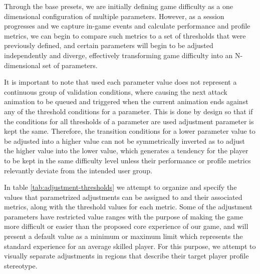 Through the base presets, we are initially defining game difficulty as a one dimensional configuration of multiple parameters. However, as a session progresses and we capture in-game events and calculate performance and profile metrics, we can begin to compare such metrics to a set of thresholds that were previously defined, and certain parameters will begin to be adjusted independently and diverge, effectively transforming game difficulty into an N-dimensional set of parameters.

It is important to note that used each parameter value does not represent a continuous group of validation conditions, where causing the next attack animation to be queued and triggered when the current animation ends against any of the threshold conditions for a parameter. This is done by design so that if the conditions for all thresholds of a parameter are used adjustment parameter is kept the same. Therefore, the transition conditions for a lower parameter value to be adjusted into a higher value can not be symmetrically inverted as to adjust the higher value into the lower value, which generates a tendency for the player to be kept in the same difficulty level unless their performance or profile metrics relevantly deviate from the intended user group.

In table \ref{tab:adjustment-thresholds} we attempt to organize  and specify the values that parametrized adjustments can be assigned to and their associated metrics, along with the threshold values for each metric. Some of the adjustment parameters have restricted value ranges with the purpose of making the game more difficult or easier than the proposed core experience of our game, and will present a default value as a minimum or maximum limit which represents the standard experience for an average skilled player. For this purpose, we attempt to visually separate adjustments in regions that describe their target player profile stereotype.



